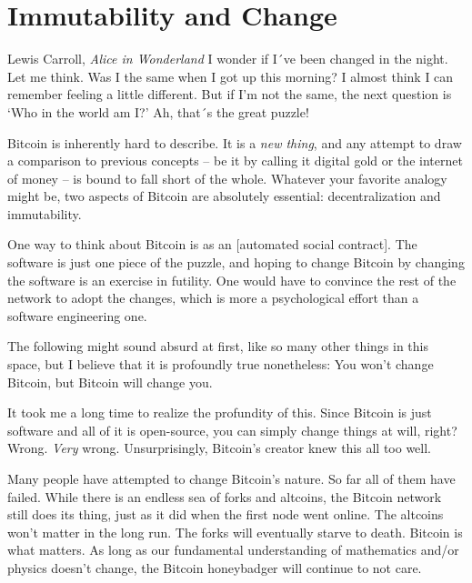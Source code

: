 \chapter{Immutability and Change}
\label{ch:immutability}

\begin{chapquote}{Lewis Carroll, \textit{Alice in Wonderland}}
I wonder if I´ve been changed in the night. Let me think. Was I the same when I
got up this morning? I almost think I can remember feeling a little different.
But if I'm not the same, the next question is `Who in the world am I?' Ah,
that´s the great puzzle!
\end{chapquote}

Bitcoin is inherently hard to describe. It is a \textit{new thing}, and any
attempt to draw a comparison to previous concepts -- be it by calling
it digital gold or the internet of money -- is bound to fall short of
the whole. Whatever your favorite analogy might be, two aspects of
Bitcoin are absolutely essential: decentralization and immutability.

One way to think about Bitcoin is as an [automated social contract]. The
software is just one piece of the puzzle, and hoping to change Bitcoin
by changing the software is an exercise in futility. One would have to
convince the rest of the network to adopt the changes, which is more a
psychological effort than a software engineering one.

The following might sound absurd at first, like so many other things in
this space, but I believe that it is profoundly true nonetheless: You
won't change Bitcoin, but Bitcoin will change you.

\bigskip


It took me a long time to realize the profundity of this. Since Bitcoin
is just software and all of it is open-source, you can simply change
things at will, right? Wrong. \textit{Very} wrong. Unsurprisingly, Bitcoin's
creator knew this all too well.


Many people have attempted to change Bitcoin's nature. So far all of
them have failed. While there is an endless sea of forks and altcoins,
the Bitcoin network still does its thing, just as it did when the first
node went online. The altcoins won't matter in the long run. The forks
will eventually starve to death. Bitcoin is what matters. As long as our
fundamental understanding of mathematics and/or physics doesn't change,
the Bitcoin honeybadger will continue to not care.

